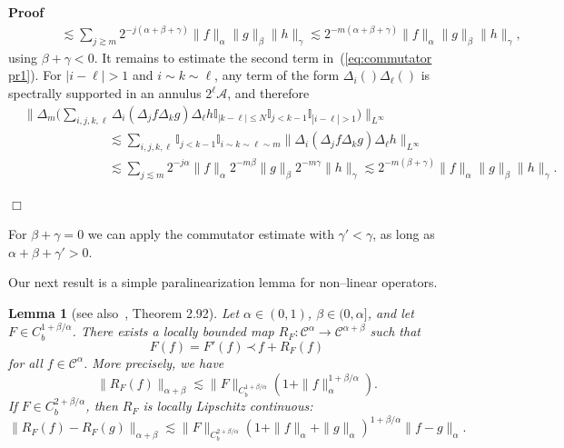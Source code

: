 \documentclass[a4paper,11pt]{article}
\newenvironment{proof}{\noindent\textbf{Proof\ }}{\hspace*{\fill}$\Box$\medskip}
\newtheorem{lemma}{Lemma}
{\theorembodyfont{\rmfamily}\newtheorem{remark}{Remark}}
\newcommand{\CA}{\mathscr{A}}
\newcommand{\CC}{\mathscr{C}}
\newcommand{\lpara}{\,\mathord{\prec}\,}
\begin{document}
\begin{proof}
\begin{align*}
     &\hspace{35pt} \lesssim \sum_{j \gtrsim m} 2^{- j (\alpha + \beta + \gamma)} \| f \|_{\alpha} \| g \|_{\beta} \| h \|_{\gamma} \lesssim 2^{- m (\alpha +  \beta + \gamma)} \| f \|_{\alpha} \| g \|_{\beta} \| h \|_{\gamma},
  \end{align*}
  using $\beta + \gamma < 0$. It remains to estimate the second term
  in~(\ref{eq:commutator pr1}). For $| i - \ell | > 1$ and $i \sim k \sim
  \ell$, any term of the form $\Delta_i () \Delta_{\ell} ()$ is spectrally
  supported in an annulus $2^{\ell} \CA$, and therefore
  \begin{align*}
      & \Big\| \Delta_m \Big( \sum_{i, j, k, \ell} \Delta_i  (\Delta_j f \Delta_k g) \Delta_{\ell} h \mathbb{I}_{| k - \ell | \leqslant N} \mathbb{I}_{j < k - 1} \mathbb{I}_{| i - \ell | > 1} \Big) \Big\|_{L^{\infty}} \\
      &\hspace{80pt} \lesssim \sum_{i, j, k, \ell} \mathbb{I}_{j < k - 1} \mathbb{I}_{i \sim k \sim \ell \sim m} \|\Delta_i  (\Delta_j f \Delta_k g) \Delta_{\ell} h \|_{L^{\infty}} \\
      &\hspace{80pt} \lesssim \sum_{j \lesssim m} 2^{- j \alpha} \| f \|_{\alpha} 2^{- m \beta} \| g \|_{\beta} 2^{- m \gamma} \| h \|_{\gamma} \lesssim 2^{- m(\beta + \gamma)} \| f \|_{\alpha} \| g \|_{\beta} \| h \|_{\gamma}.
  \end{align*}
  
\end{proof}

\begin{remark}
  For $\beta + \gamma = 0$ we can apply the commutator estimate with $\gamma'
  < \gamma$, as long as $\alpha + \beta + \gamma' > 0$.
\end{remark}

Our next result is a simple paralinearization lemma for non--linear operators.

\begin{lemma}[see also~{\cite{Bahouri2011}}, Theorem 2.92]
  \label{lemma:paralinearization}Let $\alpha \in (0, 1)$, $\beta \in (0,
  \alpha]$, and let $F \in C^{1 + \beta / \alpha}_b$. There exists a locally
  bounded map $R_F : \CC^{\alpha} \rightarrow \CC^{\alpha + \beta}$ such that
  \begin{equation}
    \label{eq:para-linearization} F (f) = F' (f) \lpara f + R_F (f)
  \end{equation}
  for all $f \in \CC^{\alpha}$. More precisely, we have
  \[ \|R_F (f)\|_{\alpha + \beta} \lesssim \|F\|_{C^{1 + \beta / \alpha}_b} 
     (1 +\|f\|_{\alpha}^{1 + \beta / \alpha}) . \]
  If $F \in C_b^{2 + \beta / \alpha}$, then $R_F$ is locally Lipschitz
  continuous:
  \[ \|R_F (f) - R_F (g)\|_{\alpha + \beta} \lesssim \|F\|_{C^{2 + \beta /
     \alpha}_b}  (1 +\|f\|_{\alpha} +\|g\|_{\alpha})^{1 + \beta / \alpha}  \|f
     - g\|_{\alpha} . \]
\end{lemma}
\end{document}

